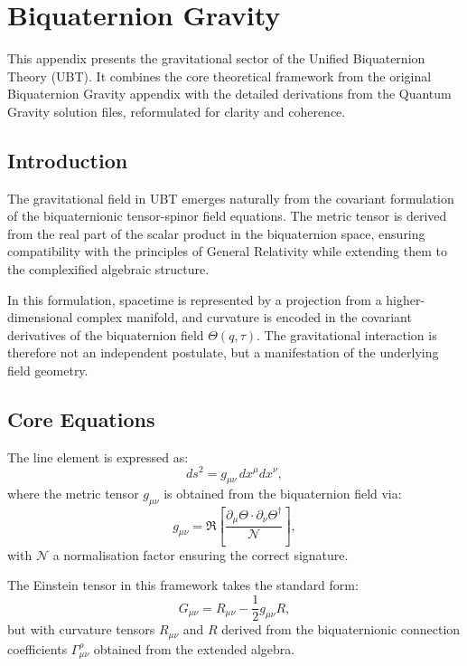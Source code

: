 
\section{Biquaternion Gravity}

This appendix presents the gravitational sector of the Unified Biquaternion Theory (UBT).
It combines the core theoretical framework from the original Biquaternion Gravity appendix
with the detailed derivations from the Quantum Gravity solution files, reformulated for
clarity and coherence.

\subsection{Introduction}

The gravitational field in UBT emerges naturally from the covariant formulation of the
biquaternionic tensor-spinor field equations. The metric tensor is derived from the real
part of the scalar product in the biquaternion space, ensuring compatibility with the
principles of General Relativity while extending them to the complexified algebraic
structure.

In this formulation, spacetime is represented by a projection from a higher-dimensional
complex manifold, and curvature is encoded in the covariant derivatives of the
biquaternion field $\Theta(q,\tau)$. The gravitational interaction is therefore not an
independent postulate, but a manifestation of the underlying field geometry.

\subsection{Core Equations}

The line element is expressed as:
\begin{equation}
  ds^2 = g_{\mu\nu} \, dx^\mu dx^\nu ,
\end{equation}
where the metric tensor $g_{\mu\nu}$ is obtained from the biquaternion field via:
\begin{equation}
  g_{\mu\nu} = \Re\left[ \frac{\partial_\mu \Theta \cdot \partial_\nu \Theta^\dagger}{\mathcal{N}} \right],
\end{equation}
with $\mathcal{N}$ a normalisation factor ensuring the correct signature.

The Einstein tensor in this framework takes the standard form:
\begin{equation}
  G_{\mu\nu} = R_{\mu\nu} - \frac{1}{2} g_{\mu\nu} R ,
\end{equation}
but with curvature tensors $R_{\mu\nu}$ and $R$ derived from the biquaternionic connection
coefficients $\Gamma^\rho_{\mu\nu}$ obtained from the extended algebra.

